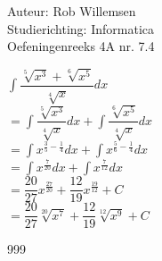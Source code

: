 \documentclass[a4paper]{article}
\newcommand{\dint}{\displaystyle\int}
\begin{document}
\noindent \large Auteur: Rob Willemsen \\
\noindent \large Studierichting: Informatica \\
\noindent \large Oefeningenreeks 4A nr. 7.4 \\

\medskip

\normalsize

$\dint \dfrac{\sqrt[5]{x^3} + \sqrt[6]{x^5}}{\sqrt[4]{x}} dx$ \\

$= \dint \dfrac{\sqrt[5]{x^3}}{\sqrt[4]{x}} dx + \dint \dfrac{\sqrt[6]{x^5}}{\sqrt[4]{x}} dx$ \\

$= \dint x^{\tfrac{3}{5} - \tfrac{1}{4}} dx + \dint x^{\tfrac{5}{6} - \tfrac{1}{4}} dx$ \\

$= \dint x^{\tfrac{7}{20}} dx + \dint x^{\tfrac{7}{12}} dx$ \\

$= \dfrac{20}{27} x^{\tfrac{27}{20}} + \dfrac{12}{19} x^{\tfrac{19}{12}} + C$ \\

$= \dfrac{20}{27} \sqrt[20]{x^{7}} + \dfrac{12}{19} \sqrt[12]{x^{9}} + C$ \\

\begin{thebibliography}{999}
\end{thebibliography}
\end{document}
